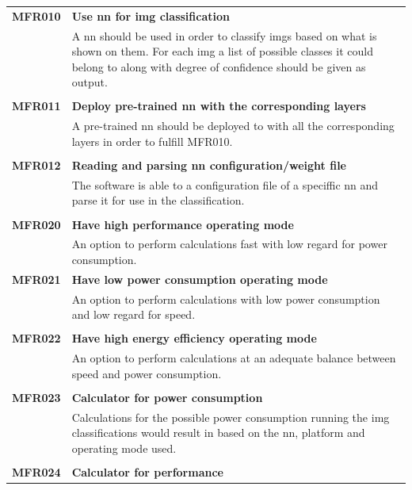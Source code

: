 \documentclass[parskip=full]{scrartcl}
\begin{document}
\begin{tabular}{p{2cm}p{12cm}}

\textbf{MFR010} & \textbf{Use \gls{nn} for \gls{img} classification}\\                                     
& A \gls{nn} should be used in order to classify \glspl{img} based on what is shown on them. For each \gls{img} a list of possible classes it could belong to along with degree of confidence should be given as output.\\
& \\
\textbf{MFR011} & \textbf{Deploy pre-trained \gls{nn} with the corresponding layers}\\
& A pre-trained \gls{nn} should be deployed to with all the corresponding layers in order to fulfill MFR010.\\
& \\
\textbf{MFR012} & \textbf{Reading and parsing \gls{nn} configuration/weight file}\\
& The software is able to a configuration file of a speciffic \gls{nn} and parse it for use in the classification.\\
& \\
\textbf{MFR020} & \textbf{Have high performance operating mode}\\                                     
& An option to perform calculations fast with low regard for power consumption.\\
\textbf{MFR021} & \textbf{Have low power consumption operating mode}\\                                     
& An option to perform calculations with low power consumption and low regard for speed.\\
& \\
\textbf{MFR022} & \textbf{Have high energy efficiency operating mode}\\                                     
& An option to perform calculations at an adequate balance between speed and power consumption.\\
& \\
\textbf{MFR023} & \textbf{Calculator for power consumption}\\                                     
& Calculations for the possible power consumption running the \gls{img} classifications would result in based on the \gls{nn}, platform and operating mode used.\\
& \\
\textbf{MFR024} & \textbf{Calculator for performance}\\                                     

\end{tabular}
\end{document}
